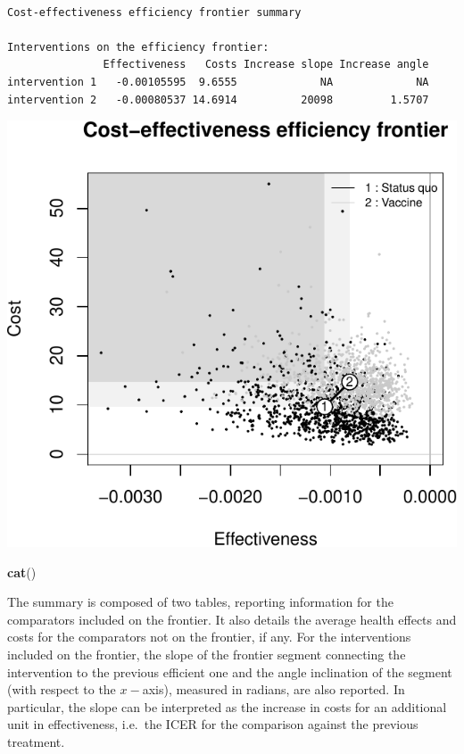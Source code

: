 \documentclass[]{article}
\newenvironment{Shaded}{\begin{snugshade}}{\end{snugshade}}
\newcommand{\KeywordTok}[1]{\textcolor[rgb]{0.13,0.29,0.53}{\textbf{#1}}}
\newcommand{\NormalTok}[1]{#1}
\begin{document}
\begin{verbatim}

Cost-effectiveness efficiency frontier summary 

Interventions on the efficiency frontier:
               Effectiveness   Costs Increase slope Increase angle
intervention 1   -0.00105595  9.6555             NA             NA
intervention 2   -0.00080537 14.6914          20098         1.5707
\end{verbatim}

\begin{center}\includegraphics{report_files/figure-latex/unnamed-chunk-7-1} \end{center}

\begin{Shaded}
\begin{Highlighting}[]
\KeywordTok{cat}\NormalTok{()}
\end{Highlighting}
\end{Shaded}

The summary is composed of two tables, reporting information for the
comparators included on the frontier. It also details the average health
effects and costs for the comparators not on the frontier, if any. For
the interventions included on the frontier, the slope of the frontier
segment connecting the intervention to the previous efficient one and
the angle inclination of the segment (with respect to the \(x-\)axis),
measured in radians, are also reported. In particular, the slope can be
interpreted as the increase in costs for an additional unit in
effectiveness, i.e.~the ICER for the comparison against the previous
treatment.
\end{document}
